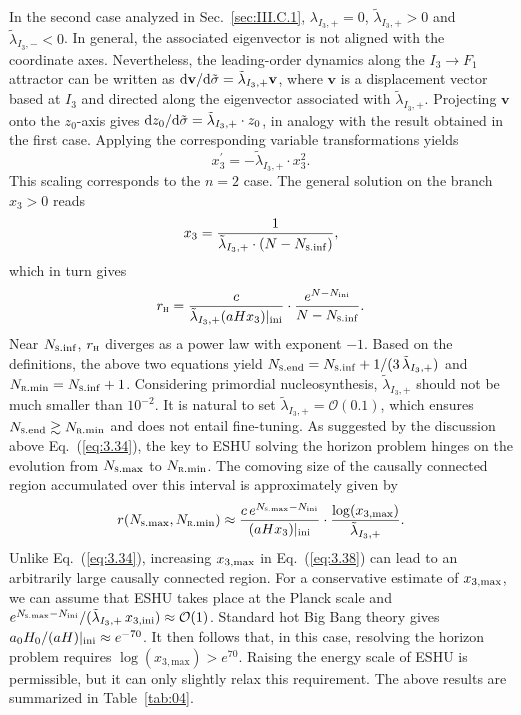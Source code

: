 \documentclass[aps,prd,twocolumn]{revtex4-2}
\newcommand\dx{{\rm d}}
\newcommand\subH{\textsc{h}}
\newcommand\subini{{\rm ini}}
\newcommand\subRmin{{\rm \textsc{r}.min}}
\newcommand\subSmax{{\rm \textsc{s}.max}}
\newcommand\subSend{{\rm \textsc{s}.end}}
\newcommand\subSinf{{\rm \textsc{s}.inf}}
\newcommand\submax{{\rm max}}
\begin{document}
In the second case analyzed in Sec.~\ref{sec:III.C.1}, $\lambda_{I_3,+}=0$, $\tilde{\lambda}_{I_3,+}>0$ and $\tilde{\lambda}_{I_3,-}<0$. In general, the associated eigenvector is not aligned with the coordinate axes. Nevertheless, the leading-order dynamics along the $I_3\rightarrow F_1$ attractor can be written as $\dx\mathbf{v}/\dx\tilde{\sigma} = \tilde{\lambda}_{I_3,+}\mathbf{v}$, where $\mathbf{v}$ is a displacement vector based at $I_3$ and directed along the eigenvector associated with $\tilde{\lambda}_{I_3,+}$. Projecting $\mathbf{v}$ onto the $z_0$-axis gives $\dx z_0/\dx\tilde{\sigma} = \tilde{\lambda}_{I_3,+}\cdot z_0$, in analogy with the result obtained in the first case. Applying the corresponding variable transformations yields
\begin{equation}
  x_3^\prime = - \tilde{\lambda}_{I_3,+} \cdot x_3^2.
\end{equation}
This scaling corresponds to the $n=2$ case. The general solution on the branch $x_3>0$ reads
\begin{equation}\label{eq:3.36}
  x_3 = \frac{1}{\tilde{\lambda}_{I_3,+} \cdot (N-N_\subSinf)},
\end{equation}
which in turn gives
\begin{equation}
  r_\subH = \frac{c}{\tilde{\lambda}_{I_3,+}(aHx_3)|_\subini} \cdot \frac{e^{N-N_\subini}}{N-N_\subSinf}.
\end{equation}
Near $N_\subSinf$, $r_\subH$ diverges as a power law with exponent $-1$. Based on the definitions, the above two equations yield $N_\subSend=N_\subSinf+1/(3\,\tilde{\lambda}_{I_3,+})$ and $N_\subRmin=N_\subSinf+1$. Considering primordial nucleosynthesis, $\tilde{\lambda}_{I_3,+}$ should not be much smaller than $10^{-2}$. It is natural to set $\tilde{\lambda}_{I_3,+}=\mathcal{O}(0.1)$, which ensures $N_\subSend\gtrsim N_\subRmin$ and does not entail fine-tuning. As suggested by the discussion above Eq.~(\ref{eq:3.34}), the key to ESHU solving the horizon problem hinges on the evolution from $N_\subSmax$ to $N_\subRmin$. The comoving size of the causally connected region accumulated over this interval is approximately given by
\begin{equation}\label{eq:3.38}
  r(N_\subSmax,N_\subRmin) \approx \frac{c\,e^{N_\subSmax-N_\subini}}{(a H x_3)|_{\subini}} \cdot \frac{\log(x_{3,\mathrm{max}})}{\tilde{\lambda}_{I_3,+}}.
\end{equation}
Unlike Eq.~(\ref{eq:3.34}), increasing $x_{3,\submax}$ in Eq.~(\ref{eq:3.38}) can lead to an arbitrarily large causally connected region. For a conservative estimate of $x_{3,\submax}$, we can assume that ESHU takes place at the Planck scale and $e^{N_\subSmax-N_\subini}/(\tilde{\lambda}_{I_3,+}\, x_{3,\subini}) \approx \mathcal{O}(1)$. Standard hot Big Bang theory gives $a_0H_0/(aH)|_{\subini}\approx e^{-70}$. It then follows that, in this case, resolving the horizon problem requires $\log(x_{3,\mathrm{max}})>e^{70}$. Raising the energy scale of ESHU is permissible, but it can only slightly relax this requirement. The above results are summarized in Table~\ref{tab:04}.
\end{document}
